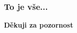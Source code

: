 \documentclass{beamer}
\begin{document}
	\begin{frame}
    \frametitle{To je vše...}
		
		\begin{center}
			\textbf{Děkuji za pozornost}
		\end{center}
	
	\end{frame}
\end{document}
